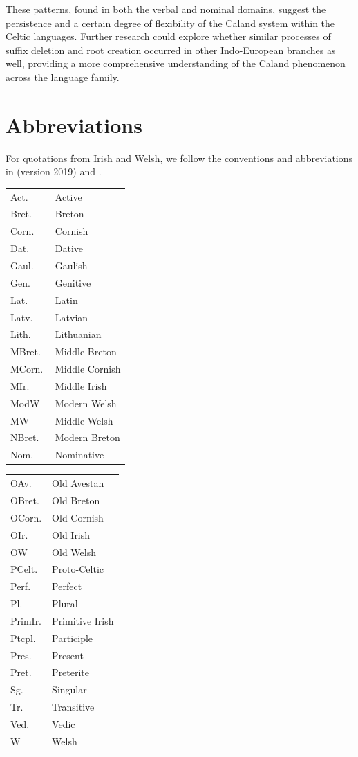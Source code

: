 \documentclass[output=paper,colorlinks,citecolor=brown]{langscibook}
\begin{document}
These patterns, found in both the verbal and nominal domains, suggest the persistence and a certain degree of flexibility of the Caland system   within the Celtic languages. Further research could explore whether similar processes of suffix deletion and root creation occurred in other Indo-European branches as well, providing a more comprehensive understanding of the Caland phenomenon   across the language family.

\section*{Abbreviations}


For quotations from Irish and Welsh, we follow the conventions and abbreviations in  (version 2019) and .\\

\begin{tabularx}{.48\textwidth}{lQ}
Act. & Active\\
Bret. & Breton \\
Corn. & Cornish \\
Dat. & Dative\\
Gaul.\ & Gaulish \\
Gen. & Genitive\\
Lat. & Latin\\
Latv. & Latvian\\
Lith. & Lithuanian\\
MBret.\ & Middle Breton \\
MCorn. & Middle Cornish \\
MIr. & Middle Irish \\
ModW & Modern Welsh \\
MW & Middle Welsh \\
NBret. & Modern Breton \\
Nom. & Nominative\\
\end{tabularx}
\begin{tabularx}{.48\textwidth}{lQ}
OAv. & Old Avestan\\
OBret. & Old Breton\\
OCorn. & Old Cornish \\
OIr.  & Old Irish \\
OW & Old Welsh \\
PCelt.\ & Proto-Celtic \\
Perf. & Perfect\\
Pl. & Plural\\
PrimIr. & Primitive Irish \\
Ptcpl. & Participle\\
Pres. & Present\\
Pret. & Preterite\\
Sg. & Singular\\
Tr. & Transitive\\
Ved. & Vedic \\
W & Welsh \\
\end{tabularx}



{\sloppy\printbibliography[heading=subbibliography,notkeyword=this]}
\end{document}
